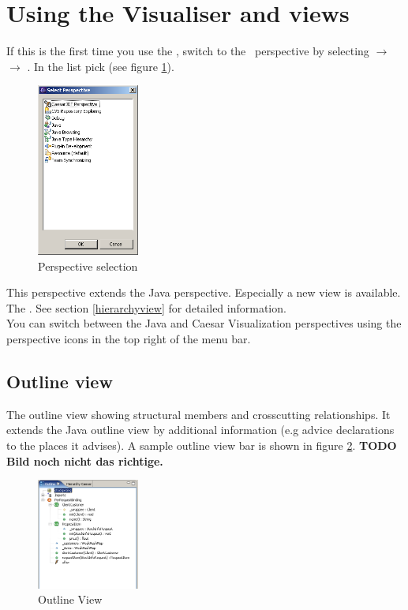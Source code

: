 \section{Using the Visualiser and views}
If this is the first time you use the \cjdt, switch to the \caesarj ~perspective by selecting  $\rightarrow$  $\rightarrow$ . In the list pick  (see figure \ref{fig:select_persp}).

\begin{figure}[htbp]
	\centering
		\includegraphics[width=0.30\textwidth]{images/select_persp.png}
	\caption{Perspective selection}
	\label{fig:select_persp}
\end{figure}

This perspective extends the Java perspective. Especially a new view is available. The . See section \ref{hierarchyview} for detailed information.\\
You can switch between the Java and Caesar Visualization perspectives using the perspective icons in the top right of the menu bar.\\
\subsection{Outline view}
The outline view showing structural members and crosscutting relationships. It extends the Java outline view by additional information (e.g advice declarations to the places it advises). A sample outline view bar is shown in figure \ref{fig:outline_view}. \textbf{TODO Bild noch nicht das richtige.}\\

\begin{figure}[htbp]
	\centering
		\includegraphics[width=0.30\textwidth]{images/outline.png}
	\caption{Outline View}
	\label{fig:outline_view}
\end{figure}

